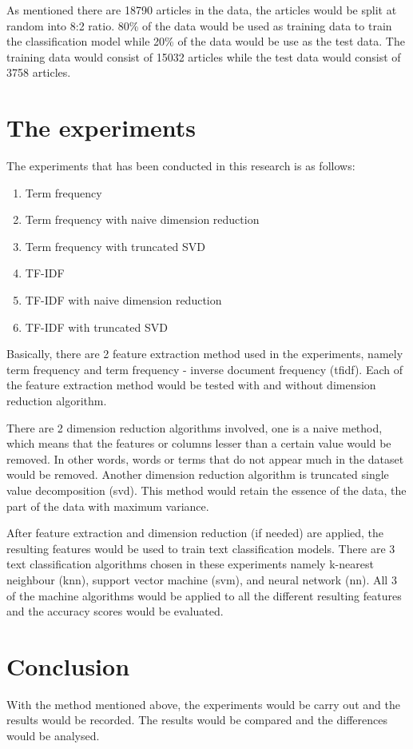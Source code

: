 As mentioned there are 18790 articles in the data, the articles would be split at random into 8:2 ratio. 80\% of the data would be used as training data to train the classification model while 20\% of the data would be use as the test data. The training data would consist of 15032 articles while the test data would consist of 3758 articles.\\


\section{The experiments}
The experiments that has been conducted in this research is as follows:
\begin{enumerate}
	\item Term frequency
	\item Term frequency with naive dimension reduction
	\item Term frequency with truncated SVD
	\item TF-IDF
	\item TF-IDF with naive dimension reduction
	\item TF-IDF with truncated SVD
\end{enumerate}

Basically, there are 2 feature extraction method used in the experiments, namely term frequency and term frequency - inverse document frequency (\ac{tfidf}). Each of the feature extraction method would be tested with and without dimension reduction algorithm.

There are 2 dimension reduction algorithms involved, one is a naive method, which means that the features or columns lesser than a certain value would be removed. In other words, words or terms that do not appear much in the dataset would be removed. Another dimension reduction algorithm is truncated single value decomposition (\ac{svd}). This method would retain the essence of the data, the part of the data with maximum variance. 

After feature extraction and dimension reduction (if needed) are applied, the resulting features would be used to train text classification models. There are 3 text classification algorithms chosen in these experiments namely k-nearest neighbour (\ac{knn}), support vector machine (\ac{svm}), and neural network (\ac{nn}). All 3 of the machine algorithms would be applied to all the different resulting features and the accuracy scores would be evaluated.


\section{Conclusion}
With the method mentioned above, the experiments would be carry out and the results would be recorded. The results would be compared and the differences would be analysed.